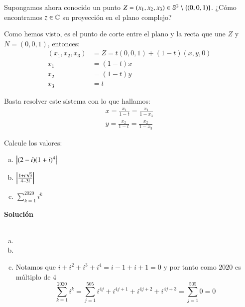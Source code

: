 \begin{obs}
        Supongamos ahora conocido un punto $Z = (x_1, x_2, x_3) \in \mathbb{S}^2\setminus\left\{(0, 0, 1)\right\}$. ¿Cómo encontramos $z\in\mathbb{C}$ su proyección en el plano complejo?

        Como hemos visto, es el punto de corte entre el plano y la recta que une $Z$ y $N = (0, 0, 1)$, entonces:
        \begin{align*}
            (x_1, x_2, x_3) &= Z = t (0, 0, 1) + (1-t)(x, y, 0)\\
            x_1 &= (1-t) x\\
            x_2 &= (1-t) y\\
            x_3 &= t
        \end{align*}

        Basta resolver este sistema con lo que hallamos:
        \begin{align*}
            x = \frac{x_1}{1-t} = \frac{x_1}{1-x_3}\\
            y = \frac{x_2}{1-t} = \frac{x_2}{1-x_3}
        \end{align*}
    \end{obs}

    \begin{ex}[H1.2]\label{ex:h1.2}
        Calcule los valores:
        \begin{enumerate}[a)]
            \item $\left|(2-i)(1+i)^4\right|$
            \item $\left|\frac{1+i\sqrt 3}{4-3i}\right|$
            \item $\sum_{k=1}^{2020} i^k$
        \end{enumerate}
        \textbf{Solución}\\\\
        \begin{enumerate}[a)]
            \item
            \item
            \item
            Notamos que $i + i^2 + i^3 + i^4 = i -1 +i +1 = 0$ y por tanto como $2020$ es múltiplo de $4$
            $$
                \sum_{k=1}^{2020} i^k = \sum_{j=1}^{505} i^{4j} + i^{4j+1} + i^{4j+2} + i^{4j+3} = \sum_{j=1}^{505} 0 = 0
            $$
        \end{enumerate}
    \end{ex}


